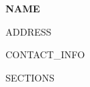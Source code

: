 \documentclass{article}
\newcommand{\name}[1]{
\begin{center}
\textbf{{\Large #1}}
\end{center}}
\newcommand{\contactinfo}[2]{
    \begin{center}
        #1

        #2
    \end{center}
}
\begin{document}
\name{NAME}

\contactinfo{ADDRESS}{CONTACT_INFO}

SECTIONS
\end{document}
